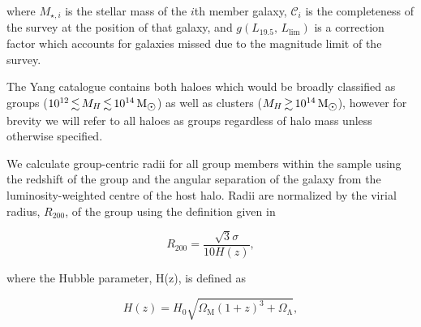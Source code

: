 \documentclass[a4paper,fleqn,usenatbib]{mnras}
\newcommand{\Msun}{\,\mathrm{M_{\sun}}}
\begin{document}
\noindent
where $M_{\star,i}$ is the stellar mass of the $i$th member galaxy,
$\mathcal{C}_i$ is the completeness of the survey at the position of
that galaxy, and $g(L_{19.5},\,L_{\text{lim}})$ is a correction factor
which accounts for galaxies missed due to the magnitude limit of the
survey.
\par
The Yang catalogue contains both haloes which would be broadly classified as
groups ($10^{12} \la M_H \la 10^{14}\Msun$) as well as clusters ($M_H
\ga 10^{14}\Msun$), however for brevity we will refer to all haloes as
groups regardless of halo mass unless otherwise specified.
\par
We calculate group-centric radii for all group members within the
sample using the redshift of the group and the angular separation of the galaxy from the
luminosity-weighted centre of the host halo.  Radii are
normalized by the virial radius, $R_{200}$, of the group using the
definition given in \citet{carlberg1997}

\begin{equation}
  R_{200} = \frac{\sqrt{3} \sigma}{10 H(z)},
\end{equation}

\noindent
where the Hubble parameter, H(z), is defined as

\begin{equation}
  H(z) = H_0 \sqrt{\Omega_\mathrm{M} (1+z)^3 +
    \Omega_\mathrm{\Lambda}},
\end{equation}
\end{document}
